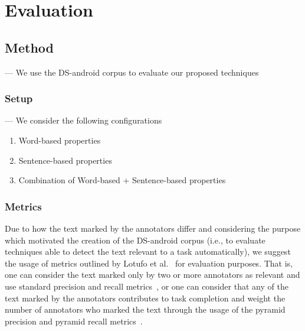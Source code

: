 \section{Evaluation}
\label{cp5:evaluation}




\subsection{Method}



--- We use the \acs{DS-android} corpus to evaluate our proposed techniques  \vspace{3mm}


\subsubsection{Setup}

--- We consider the following configurations  \vspace{3mm}

\begin{enumerate}
    \item Word-based properties
    \item Sentence-based properties
    \item Combination of Word-based + Sentence-based properties
\end{enumerate}



\subsubsection{Metrics}


Due to how the text marked by the annotators differ
and considering the purpose which motivated the creation of the \acs{DS-android} corpus
(i.e., to evaluate techniques able to detect the text relevant to a task automatically),
we suggest the usage of metrics outlined by Lotufo et al.~\cite{Lotufo2012} for evaluation purposes. 
That is,
one can consider the text marked only by two or more annotators as relevant
and use standard precision and recall metrics~\cite{Manning2009IR}, or one can consider that
any of the text marked by the annotators 
contributes to task completion and weight the number of 
annotators who marked the text through the usage of the pyramid 
precision and pyramid recall metrics~\cite{Nenkova2004, Lotufo2012}. 
 





